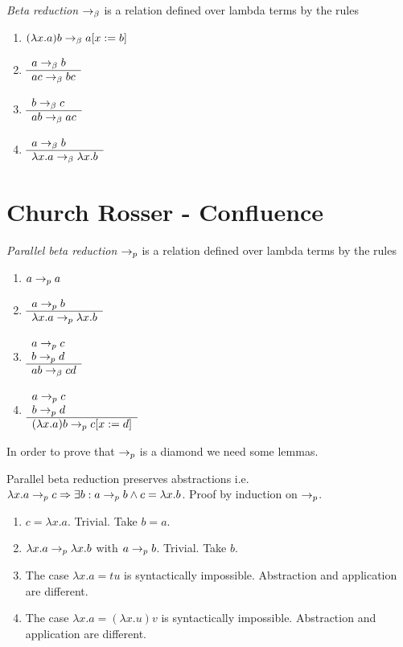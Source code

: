 \documentclass{article}
\begin{document}
\begin{definition} \emph{Beta reduction} $\to_\beta$ is a relation defined over lambda
  terms by the rules
  \begin{enumerate}
  \item $(\lambda x.a) b \to_\beta a[x := b]$
  \item $\begin{array}{l} a\to_\beta b \\ \hline a c \to_\beta b c\end{array}$
  \item $\begin{array}{l} b\to_\beta c \\ \hline a b \to_\beta a c\end{array}$
  \item $\begin{array}{l} a \to_\beta b \\ \hline \lambda x.a \to_\beta \lambda x.b\end{array}$
  \end{enumerate}
\end{definition}

\section{Church Rosser - Confluence}

\begin{definition} \emph{Parallel beta reduction} $\to_{p}$ is a relation
  defined over lambda terms by the rules
  \begin{enumerate}
  \item $a \to_{p} a$
  \item $\begin{array}{l} a \to_{p} b \\ \hline \lambda x.a \to_{p} \lambda x.b\end{array}$
  \item $\begin{array}{l} a\to_{p} c \\ b \to_{p} d \\ \hline a b \to_\beta c d\end{array}$
  \item $\begin{array}{l} a\to_{p} c \\ b \to_{p} d \\ \hline (\lambda x.a) b \to_{p} c[x := d]\end{array}$
  \end{enumerate}
\end{definition}

In order to prove that $\to_{p}$ is a diamond we need some lemmas.

\begin{lemma}
  Parallel beta reduction preserves abstractions i.e.
  $\lambda x.a \to_{p} c \Rightarrow \exists b : a \to_{p} b \land c = \lambda
  x.b$. Proof by induction on $\to_{p}$.
  \begin{enumerate}
  \item $c = \lambda x.a$. Trivial. Take $b = a$.
  \item $\lambda x.a \to_{p} \lambda x.b$ with $a \to_{p} b$. Trivial. Take $b$.
  \item The case $\lambda x.a = t u$ is syntactically impossible. Abstraction
    and application are different.
  \item The case $\lambda x.a = (\lambda x.u) v$ is syntactically
    impossible. Abstraction and application are different.
  \end{enumerate}
\end{lemma}
\end{document}
